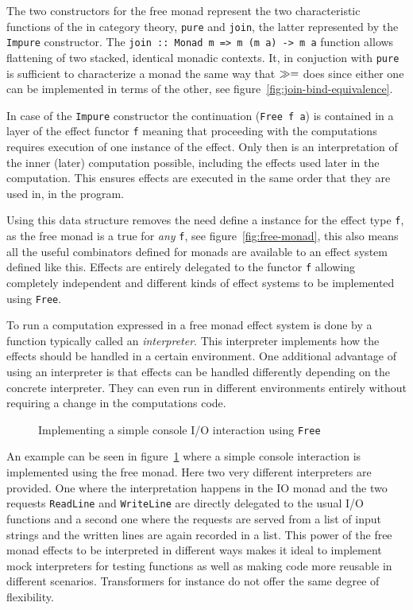 The two constructors for the free monad represent the two
characteristic functions of the \Monad{} in category theory,
\texttt{pure} and \texttt{join}, the latter represented by the
\texttt{Impure} constructor. The \texttt{join :: Monad m => m (m a) ->
  m a} function allows flattening of two stacked, identical monadic
contexts. It, in conjuction with \texttt{pure} is sufficient to
characterize a monad the same way that $\gg=$ does since either one
can be implemented in terms of the other, see
figure~\ref{fig:join-bind-equivalence}.

In case of the \texttt{Impure} constructor the continuation
(\texttt{Free f a}) is contained in a layer of the effect functor
\texttt{f} meaning that proceeding with the computations requires
execution of one instance of the effect. Only then is an
interpretation of the inner (later) computation possible, including
the effects used later in the computation. This ensures effects are
executed in the same order that they are used in, in the program.

Using this data structure removes the need define a \Monad{} instance
for the effect type \texttt{f}, as the free monad is a true \Monad{}
for \emph{any} \Functor{} \texttt{f}, see
figure~\ref{fig:free-monad}, this also means all the
useful combinators defined for monads are available to an effect
system defined like this. Effects are entirely delegated to the
functor \texttt{f} allowing completely independent and different kinds
of effect systems to be implemented using \texttt{Free}.

To run a computation expressed in a free monad effect system is done
by a function typically called an \emph{interpreter}. This interpreter
implements how the effects should be handled in a certain
environment. One additional advantage of using an interpreter is that
effects can be handled differently depending on the concrete
interpreter. They can even run in different environments entirely
without requiring a change in the computations code.

\begin{figure}
  
   \caption{Implementing a simple console I/O interaction using
    \texttt{Free}}
  \label{fig:console-io-example}
\end{figure}

An example can be seen in figure~\ref{fig:console-io-example} where a
simple console interaction is implemented using the free monad. Here
two very different interpreters are provided. One where the
interpretation happens in the IO monad and the two requests
\texttt{ReadLine} and \texttt{WriteLine} are directly delegated to the
usual I/O functions and a second one where the requests are served
from a list of input strings and the written lines are again recorded
in a list. This power of the free monad effects to be interpreted in
different ways makes it ideal to implement mock interpreters for
testing functions as well as making code more reusable in different
scenarios. Transformers for instance do not offer the same degree of
flexibility.

